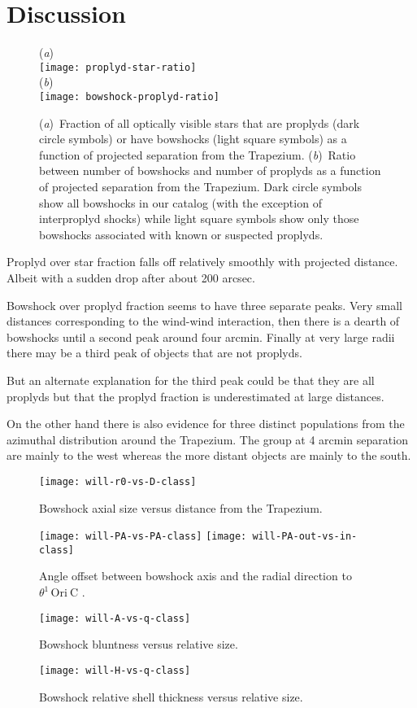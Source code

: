 \documentclass[iop, apj]{emulateapj}
\newcommand\thC{\ensuremath{\theta^1\,\mathrm{Ori~C}}}
\begin{document}
\section{Discussion}
\label{sec:discuss}
\begin{figure}
  (\textit{a})\\
  \texttt{[image: proplyd-star-ratio]}\\
  (\textit{b})\\
  \texttt{[image: bowshock-proplyd-ratio]}
  \caption{(\textit{a})~Fraction of all optically visible stars that
    are proplyds (dark circle symbols) or have bowshocks (light square
    symbols) as a function of projected separation from the Trapezium.
    (\textit{b})~Ratio between number of bowshocks and number of
    proplyds as a function of projected separation from the Trapezium.
    Dark circle symbols show all bowshocks in our catalog (with the
    exception of interproplyd shocks) while light square symbols show
    only those bowshocks associated with known or suspected proplyds.
  }
  \label{fig:bow-proplyd-star-ratios}
\end{figure}

Proplyd over star fraction falls off relatively smoothly with projected distance.  Albeit with a sudden drop after about 200 arcsec.


Bowshock over proplyd fraction seems to have three separate peaks.   Very small distances corresponding to the wind-wind interaction, then there is a dearth of bowshocks until a second peak around four arcmin.  Finally at very large radii there may be a third peak of objects that are not proplyds.

But an alternate explanation for the third peak could be that they are all proplyds but that the proplyd fraction is underestimated at large distances.

On the other hand there is also evidence for three distinct populations from the azimuthal distribution around the Trapezium.  The group at 4 arcmin separation are mainly to the west whereas the more distant objects are mainly to the south.


\begin{figure}
  \centering
  \texttt{[image: will-r0-vs-D-class]}
  \caption{Bowshock axial size versus distance from the Trapezium.}
  \label{fig:size-v-distance}
\end{figure}
\begin{figure}
  \centering
  \texttt{[image: will-PA-vs-PA-class]}
  \texttt{[image: will-PA-out-vs-in-class]}
  \caption{Angle offset between bowshock axis and the radial direction to \thC{} .}
  \label{fig:PA-v-PA}
\end{figure}
\begin{figure}
  \centering
  \texttt{[image: will-A-vs-q-class]}
  \caption{Bowshock bluntness versus relative size.}
  \label{fig:A-v-q}
\end{figure}
\begin{figure}
  \centering
  \texttt{[image: will-H-vs-q-class]}
  \caption{Bowshock relative shell thickness versus relative size.}
  \label{fig:PA-v-PA}
\end{figure}
\end{document}
